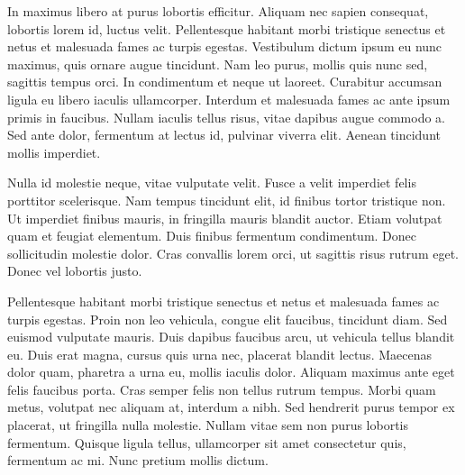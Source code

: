\documentclass[twoside, man, a4paper,12pt, nofontenc]{apa7}
\begin{document}
In maximus libero at purus lobortis efficitur. Aliquam nec sapien
consequat, lobortis lorem id, luctus velit. Pellentesque habitant morbi
tristique senectus et netus et malesuada fames ac turpis egestas.
Vestibulum dictum ipsum eu nunc maximus, quis ornare augue tincidunt.
Nam leo purus, mollis quis nunc sed, sagittis tempus orci. In
condimentum et neque ut laoreet. Curabitur accumsan ligula eu libero
iaculis ullamcorper. Interdum et malesuada fames ac ante ipsum primis in
faucibus. Nullam iaculis tellus risus, vitae dapibus augue commodo a.
Sed ante dolor, fermentum at lectus id, pulvinar viverra elit. Aenean
tincidunt mollis imperdiet.

Nulla id molestie neque, vitae vulputate velit. Fusce a velit imperdiet
felis porttitor scelerisque. Nam tempus tincidunt elit, id finibus
tortor tristique non. Ut imperdiet finibus mauris, in fringilla mauris
blandit auctor. Etiam volutpat quam et feugiat elementum. Duis finibus
fermentum condimentum. Donec sollicitudin molestie dolor. Cras convallis
lorem orci, ut sagittis risus rutrum eget. Donec vel lobortis justo.

Pellentesque habitant morbi tristique senectus et netus et malesuada
fames ac turpis egestas. Proin non leo vehicula, congue elit faucibus,
tincidunt diam. Sed euismod vulputate mauris. Duis dapibus faucibus
arcu, ut vehicula tellus blandit eu. Duis erat magna, cursus quis urna
nec, placerat blandit lectus. Maecenas dolor quam, pharetra a urna eu,
mollis iaculis dolor. Aliquam maximus ante eget felis faucibus porta.
Cras semper felis non tellus rutrum tempus. Morbi quam metus, volutpat
nec aliquam at, interdum a nibh. Sed hendrerit purus tempor ex placerat,
ut fringilla nulla molestie. Nullam vitae sem non purus lobortis
fermentum. Quisque ligula tellus, ullamcorper sit amet consectetur quis,
fermentum ac mi. Nunc pretium mollis dictum.
\end{document}
